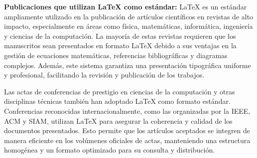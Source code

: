 \documentclass[10pt,twocolumn]{article}
\begin{document}


{\raggedleft \textbf{Publicaciones que utilizan LaTeX como estándar:}}
LaTeX es un estándar ampliamente utilizado en la publicación de artículos científicos en revistas de alto impacto, especialmente en áreas como física, matemáticas, informática, ingeniería y ciencias de la computación. 
La mayoría de estas revistas requieren que los manuscritos sean presentados en formato LaTeX debido a sus ventajas en la gestión de ecuaciones matemáticas, referencias bibliográficas y diagramas complejos. 
Además, este sistema garantiza una presentación tipográfica uniforme y profesional, facilitando la revisión y publicación de los trabajos.

Las actas de conferencias de prestigio en ciencias de la computación y otras disciplinas técnicas también han adoptado LaTeX como formato estándar. 
Conferencias reconocidas internacionalmente, como las organizadas por la IEEE, ACM y SIAM, utilizan LaTeX para asegurar la coherencia y calidad de los documentos presentados. 
Esto permite que los artículos aceptados se integren de manera eficiente en los volúmenes oficiales de actas, manteniendo una estructura homogénea y un formato optimizado para su consulta y distribución.
\end{document}
